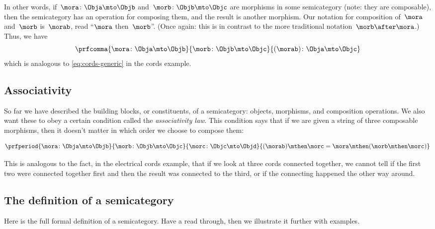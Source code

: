 In other words, if~$\mora\colon \Obja \mto \Objb$ and~$\morb\colon \Objb \mto \Objc$ are morphisms in some semicategory (note: they are composable), then the semicategory has an operation for composing them, and the result is another morphism.
Our notation for composition of~$\mora$ and~$\morb$ is~$\morab$, read ``$\mora$ then~$\morb$''.
(Once again: this is in contrast to the more traditional notation~$\morb \after \mora$.)
Thus, we have
\begin{equation}
    \prfcomma{
        \mora \colon \Obja \mto \Objb
    }{
        \morb\colon \Objb \mto \Objc
    }{
        (\morab )\colon \Obja \mto \Objc
    }
\end{equation}
which is analogous to \cref{eq:cords-generic} in the cords example.

\subsection{Associativity}

So far we have described the building blocks, or constituents, of a semicategory: objects, morphisms, and composition operations.
We also want these to obey a certain condition called the \emph{associativity law}.
This condition says that if we are given a string of three composable morphisms, then it doesn't matter in which order we choose to compose them:

\begin{equation}
    \prfperiod{
        \mora \colon \Obja \mto \Objb
    }{
        \morb\colon \Objb \mto \Objc
    }{
        \morc \colon \Objc \mto \Objd
    }{
        (\morab ) \mthen \morc = \mora \mthen ( \morb  \mthen \morc )
    }
\end{equation}

This is analogous to the fact, in the electrical cords example, that if we look at three cords connected together, we cannot tell if the first two were connected together first and then the result was connected to the third, or if the connecting happened the other way around.

\subsection{The definition of a semicategory}

Here is the full formal definition of a semicategory.
Have a read through, then we illustrate it further with examples.

